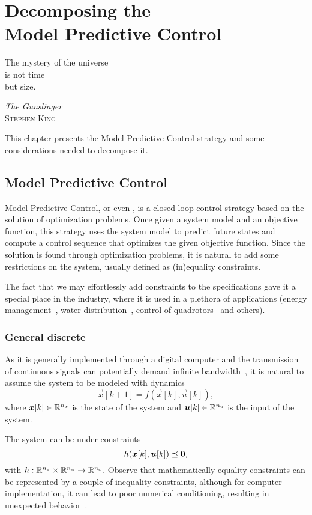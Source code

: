\documentclass[../main.tex]{subfiles}
\begin{document}
\chapter[Decomposing the Model Predictive Control]{Decomposing the\\ Model Predictive Control}\label{sec:decomposing_mpc}
\epigraph{\centering The mystery of the universe \\ is not time \\but size.}
{\textit{The Gunslinger}\\\textsc{Stephen King}}

This chapter presents the Model Predictive Control strategy and some considerations needed to decompose it.

\minitoc

\section{Model Predictive Control}
Model Predictive Control, or even \mpc, is a closed-loop control strategy based
on the solution of optimization problems.
Once given a system model and an objective function, this strategy uses the system model to predict future states and compute a control sequence that optimizes the given objective function.
Since the solution is found through optimization problems, it is natural to add some restrictions on the system, usually defined as (in)equality constraints.

The fact that we may effortlessly add constraints to the specifications gave it a special place in the industry, where it is used in a plethora of applications (energy management~\cite{AnandutaEtAl2018}, water distribution~\cite{ZhangEtAl2021}, control of quadrotors~\cite{BanguraMahony2014} and others).

\subsection{General discrete \mpc\ }
As it is generally implemented through a digital computer and the transmission of continuous signals can potentially demand infinite bandwidth~\cite{HeEtAl2022}, it is natural to assume the system to be modeled with \dt{} dynamics
\begin{equation}
\vec{x}[k+1]=f(\vec{x}[k],\vec{u}[k]),
\end{equation}
where $\boldsymbol{x}[k]\in\mathbb{R}^{n_{x}}$ is the state of the system and $\boldsymbol{u}[k]\in\mathbb{R}^{n_{u}}$ is the input of the system.

The system can be under constraints
\begin{equation}
 h(\boldsymbol{x}[k],\boldsymbol{u}[k])\preceq\mathbf{0},
\end{equation}
with ${h:\mathbb{R}^{n_{x}}\times\mathbb{R}^{n_{u}}\to\mathbb{R}^{n_{c}}}$.
Observe that mathematically equality constraints can be represented by a couple of inequality constraints, although for computer implementation, it can lead to poor numerical conditioning, resulting in unexpected behavior~\cite{BorrelliEtAl2017}.
\end{document}
